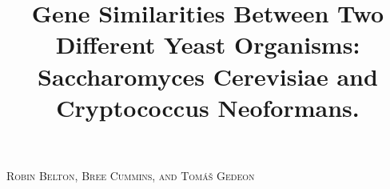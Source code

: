 \documentclass[11pt]{amsart}
\title[Gene Similarities in Yeast Organisms] {Gene Similarities Between Two Different Yeast Organisms: Saccharomyces Cerevisiae and
Cryptococcus Neoformans.}
\author[R. Belton and B. Cummins and T. Gedeon]{}
\begin{document}
\centerline{\scshape Robin Belton, Bree Cummins, and Tom\'{a}\v{s} Gedeon}







\maketitle








\end{document}

